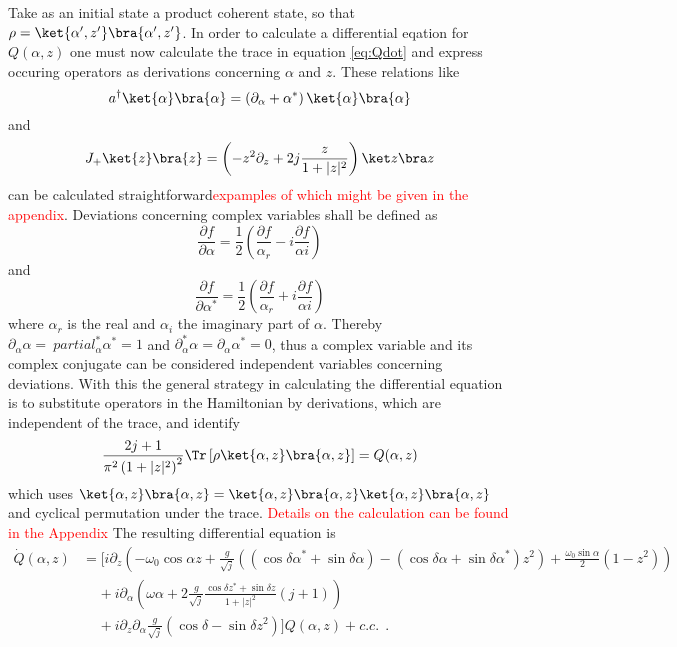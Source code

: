 Take as an initial state a product coherent state, so that $\rho = \ket{\alpha', z'}\bra{\alpha', z'}$.
In order to calculate a differential eqation for $Q(\alpha, z)$ one must now calculate the trace in equation \eqref{eq:Qdot} and express occuring operators as derivations concerning $\alpha$ and $z$.
These relations like
\begin{equation}
  a^\dagger \ket{\alpha}\bra{\alpha} = \left(\partial_\alpha + \alpha^*\right)\ket{\alpha}\bra{\alpha}
\end{equation}
and
\begin{equation}
 J_+ \ket{z}\bra{z} = \left( -z^2 \partial_z + 2j\frac{z}{1+|z|^2}\right)\ket z \bra z
\end{equation}
can be calculated straightforward\textcolor{red}{expamples of which might be given in the appendix}.
Deviations concerning complex variables shall be defined as
\begin{equation}
  \frac{\partial f}{\partial \alpha} = \frac{1}{2}\left( \frac{\partial f}{\alpha_r} - i \frac{\partial f}{\alpha i}\right)
\end{equation}
and 
\begin{equation}
  \frac{\partial f}{\partial \alpha^*} = \frac{1}{2}\left( \frac{\partial f}{\alpha_r} + i \frac{\partial f}{\alpha i}\right)
\end{equation}
where $\alpha_r$ is the real and $\alpha_i$ the imaginary part of $\alpha$.
Thereby $\partial_\alpha \alpha =\ partial_\alpha^* \alpha^* = 1$ and $\partial_\alpha^* \alpha = \partial_\alpha \alpha^* = 0$, thus a complex variable and its complex conjugate can be considered independent variables concerning deviations.
With this the general strategy in calculating the differential equation is to substitute operators in the Hamiltonian by derivations, which are independent of the trace, and identify 
\begin{equation}
  \frac{2j + 1}{\pi^2 \left(1 + |z|^2\right)^2} \Tr \left[ \rho \ket{\alpha,z}\bra{\alpha,z} \right] = Q(\alpha, z)
\end{equation}
which uses $\ket{\alpha,z}\bra{\alpha,z} = \ket{\alpha,z}\bra{\alpha,z}\ket{\alpha,z}\bra{\alpha,z}$ and cyclical permutation under the trace.
\textcolor{red}{Details on the calculation can be found in the Appendix} The resulting differential equation is
\begin{align}
  \dot Q(\alpha,z) &= \Bigg[i\partial_z \left(-\omega_0\cos\alpha z + \frac{g}{\sqrt{j}}\left( (\cos\delta\alpha^* + \sin\delta\alpha)-(\cos\delta\alpha + \sin\delta\alpha^*)z^2\right) + \frac{\omega_0\sin\alpha}{2} (1-z^2)\right)\nonumber \\
  &~~~~~+ i\partial_\alpha \left( \omega \alpha + 2 \frac{g}{\sqrt{j}} \frac{\cos\delta z^* + \sin\delta z}{1+|z|^2} (j+1) \right)\nonumber\\
  &~~~~~+ i \partial_z \partial_\alpha \frac{g}{\sqrt{j}} \left(\cos\delta - \sin\delta z^2\right)\Bigg] Q (\alpha,z) + c.c.~~.
\end{align}
